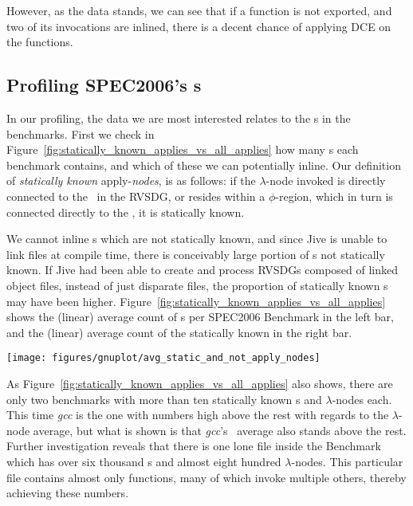 However, as the data stands, we can see that if a function is not exported, and
two of its invocations are inlined, there is a decent chance of applying DCE on
the functions.

\subsection{Profiling SPEC2006's \applyNode s}
\label{sub:res:ic_profiling}

In our profiling, the data we are most interested relates to the \applyNode s in
the benchmarks. First we check in
Figure~\ref{fig:statically_known_applies_vs_all_applies} how many \applyNode s
each benchmark contains, and which of these we can potentially inline. Our
definition of \textit{statically known} apply-\textit{nodes}, is as follows: if
the $\lambda$-node invoked is directly connected to the \applyNode~in the RVSDG,
or resides within a $\phi$-region, which in turn is connected directly to the
\applyNode , it is statically known.

We cannot inline \applyNode s which are not statically known, and since Jive is
unable to link files at compile time, there is conceivably large portion of
\applyNode s not statically known. If Jive had been able to create and process
RVSDGs composed of linked object files, instead of just disparate files, the
proportion of statically known \applyNode s may have been higher.
Figure~\ref{fig:statically_known_applies_vs_all_applies} shows the (linear)
average count of \applyNode s per SPEC2006 Benchmark in the left bar, and the
(linear) average count of the statically known in the right bar.

\begin{centering}
	\noindent\begin{minipage}{\textwidth}
		\captionsetup{type=figure}
		\hspace{-1em}
		\texttt{[image: figures/gnuplot/avg\_static\_and\_not\_apply\_nodes]}
	\end{minipage}
	\label{fig:statically_known_applies_vs_all_applies}
\end{centering}

As Figure~\ref{fig:statically_known_applies_vs_all_applies} also shows, there
are only two benchmarks with more than ten statically known \applyNode s and
$\lambda$-nodes each. This time \textit{gcc} is the one with numbers high above
the rest with regards to the $\lambda$-node average, but what is shown is that
\textit{gcc}'s \applyNode~average also stands above the rest. Further
investigation reveals that there is one lone file inside the Benchmark which has
over six thousand \applyNode s and almost eight hundred $\lambda$-nodes. This
particular file contains almost only functions, many of which invoke multiple
others, thereby achieving these numbers.

